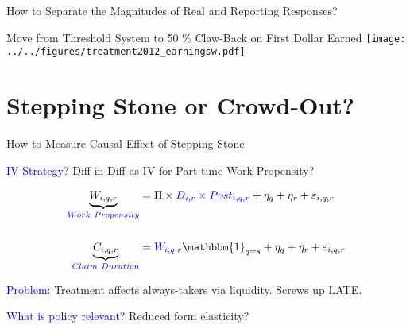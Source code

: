 \documentclass{beamer}
\newcommand{\bb}[1]{\mathbbm{#1}}
\begin{document}
\begin{frame}{How to Separate the Magnitudes of Real and Reporting Responses?}
\end{frame}

\begin{frame}{Move from Threshold System to 50 \% Claw-Back on First Dollar Earned}
	\centering	\texttt{[image: ../../figures/treatment2012\_earningsw.pdf]}	
\end{frame}

\section{Stepping Stone or Crowd-Out?}

\begin{frame}{How to Measure Causal Effect of Stepping-Stone}


\textcolor{blue}{IV Strategy?} Diff-in-Diff as IV for Part-time Work Propensity?


\begin{align*}
\underbrace{W_{i,q,r}}_{\textcolor{blue}{Work \ Propensity}} &=  \Pi \times \textcolor{blue}{D_{i,r}\times Post_{i,q,r}} + \eta_q + \eta_r  +  \varepsilon_{i,q,r} \\
\\
\underbrace{C_{i,q,r}}_{\textcolor{blue}{Claim \ Duration}} &= \textcolor{blue}{W_{i,q,r}} \bb{1}_{q=s} + \eta_q + \eta_r  +  \varepsilon_{i,q,r}
\end{align*}

\bigskip

\textcolor{blue}{Problem:} Treatment affects always-takers via liquidity. Screws up LATE.

\bigskip

\textcolor{blue}{What is policy relevant?} Reduced form elasticity?

\end{frame}
\end{document}
